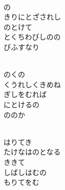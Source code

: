 \documentclass[10pt,b5j]{tarticle} %
\begin{document}
\vspace{1.5em} %
\newcommand{\linespace}{0.5em} %
\newcommand{\blocksize}{0.5\hsize} %
\newcommand{\itemmargin}{3em} %
\begin{enumerate} %
    \setlength{\itemindent}{\itemmargin} %
    \begin{minipage}[c]{\blocksize}
    
        \vspace{\linespace}
        \item~\\
        の\\
        きりにとざされし\\
        のとけて\\
        とくちわびしのの\\
        びふすなり
        
    \end{minipage}
    \begin{minipage}[c]{\blocksize}
        
        \vspace{\linespace}
        \item~\\
        のくの\\
        くうれしくきめね\\
        ぎしをむれば\\
        にとけるの\\
        ののか
        
    \end{minipage}
    \begin{minipage}[c]{\blocksize}
        
        \vspace{\linespace}
        \item~\\
        はりてき\\
        たけなはのとなる\\
        ききて\\
        しばしはむの\\
        もりてをむ
        

\end{minipage}
\end{enumerate}
\end{document}
